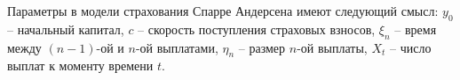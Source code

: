 \begin{note}
Параметры в модели страхования Спарре Андерсена имеют следующий смысл: $\displaystyle y_{0}$ -- начальный капитал, $\displaystyle c$ -- скорость поступления страховых взносов, $\displaystyle \xi _{n}$ -- время между $\displaystyle ( n-1)$-ой и $\displaystyle n$-ой выплатами, $\displaystyle \eta _{n}$ -- размер $\displaystyle n$-ой выплаты, $\displaystyle X_{t}$ -- число выплат к моменту времени $\displaystyle t$.
\end{note}